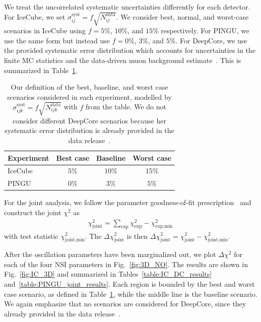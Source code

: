 We treat the uncorrelated systematic uncertainties differently for each detector. For IceCube, we set $\sigma_{ij}^\text{syst} = f\sqrt{N_{ij}^\text{data}}$.
We consider best, normal, and worst-case scenarios in IceCube using
$f=5\%$, $10\%$, and $15\%$ respectively. For PINGU, we use the same form but instead use $f=0\%$, $3\%$, and $5\%$.
For DeepCore, we use the provided systematic error distribution which accounts for uncertainties in the finite MC statistics and the data-driven 
muon background estimate~\cite{DC2019data}. This is summarized in Table~\ref{table:syst_errors}.
{\renewcommand{\arraystretch}{1.2}
\begin{table}
   \centering
   \begin{tabular}{lccc}
      \hline \hline
      Experiment & Best case & Baseline & Worst case \\
      \hline
      IceCube & $5\%$ & $10\%$ & $15\%$ \\
      PINGU & $0\%$ & $3\%$ & $5\%$ \\
      \hline \hline
   \end{tabular}
   \caption{Our definition of the best, baseline, and worst case scenarios considered in each experiment, modelled by $\sigma_{ijk}^\text{syst} = f\sqrt{N_{ijk}^\text{data}}$ with $f$ from the table.
   We do not consider different DeepCore scenarios because her systematic error distribution is already provided in the data release~\cite{DC2019data}.}\label{table:syst_errors}
\end{table}

For the joint analysis, we follow the parameter goodness-of-fit prescription~\cite{maltoni2003} and construct the joint $\chi^2$ as 
\begin{align}\label{eq:joint_chisq}
    \chi^2_\text{joint} = \sum_\text{exp}\chi^2_\text{exp} - \chi^2_\text{exp,min}\,
\end{align}
with test statistic $\chi^2_\text{joint,min}$. The $\Delta \chi^2_\text{joint}$ is then $\Delta \chi^2_\text{joint} = \chi^2_\text{joint} - \chi^2_\text{joint,min}$.

After the oscillation parameters have been marginalized out, we plot $\Delta \chi^2$ for each of the four NSI parameters in Fig.~\ref{fig:3D_NO}. 
The results are shown in Fig.~\ref{fig:IC_3D} and summarized in Tables~\ref{table:IC_DC_results} and~\ref{table:PINGU_joint_results}. Each region is bounded
by the best and worst case scenario, as defined in Table~\ref{table:syst_errors}, while the middle line is the baseline scenario. We again emphasize that 
no scenarios are considered for DeepCore, since they already provided in the data release~\cite{DC2019data}.

}

